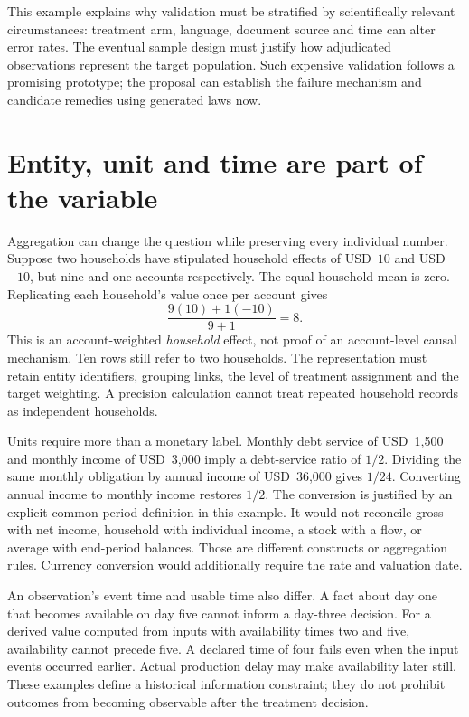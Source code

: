 This example explains why validation must be stratified by scientifically
relevant circumstances: treatment arm, language, document source and time
can alter error rates. The eventual sample design must justify how
adjudicated observations represent the target population. Such expensive
validation follows a promising prototype; the proposal can establish the
failure mechanism and candidate remedies using generated laws now.

\section{Entity, unit and time are part of the variable}

Aggregation can change the question while preserving every individual number.
Suppose two households have stipulated household effects of USD~\(10\) and
USD~\(-10\), but nine and one accounts respectively. The equal-household mean
is zero. Replicating each household's value once per account gives
\[
 \frac{9(10)+1(-10)}{9+1}=8.
\]
This is an account-weighted \emph{household} effect, not proof of an
account-level causal mechanism. Ten rows still refer to two households.
The representation must retain entity identifiers, grouping links,
the level of treatment assignment and the target weighting. A precision
calculation cannot treat repeated household records as independent households.
\citep{exec17_ontology_oracle}

Units require more than a monetary label. Monthly debt service of
USD~1,500 and monthly income of USD~3,000 imply a debt-service ratio of \(1/2\).
Dividing the same monthly obligation by annual income of USD~36,000 gives
\(1/24\). Converting annual income to monthly income restores \(1/2\).
The conversion is justified by an explicit common-period definition in this
example. It would not reconcile gross with net income, household with
individual income, a stock with a flow, or average with end-period balances.
Those are different constructs or aggregation rules. Currency conversion
would additionally require the rate and valuation date.

An observation's event time and usable time also differ. A fact about day
one that becomes available on day five cannot inform a day-three decision.
For a derived value computed from inputs with availability times two and
five, availability cannot precede five. A declared time of four fails even
when the input events occurred earlier. Actual production delay may make
availability later still. These examples define a historical information
constraint; they do not prohibit outcomes from becoming observable after
the treatment decision.~\citep{exec17_ontology_oracle}

